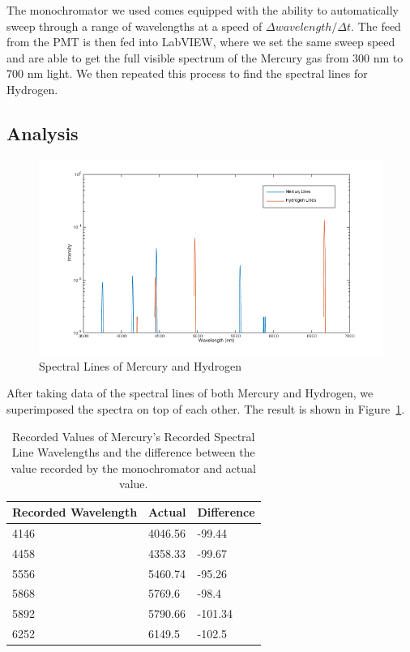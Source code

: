 The monochromator we used comes equipped with the ability to automatically sweep through a range of wavelengths at a speed of $\Delta wavelength / \Delta t$. The feed from the PMT is then fed into LabVIEW, where we set the same sweep speed and are able to get the full visible spectrum of the Mercury gas from 300 nm to 700 nm light. We then repeated this process to find the spectral lines for Hydrogen. 

\subsection{Analysis}

\begin{figure}[t]
  \includegraphics[width=\textwidth, height = 10 cm]{Balmer.png}
  \caption{Spectral Lines of Mercury and Hydrogen}
  \label{Spectrums}
\end{figure}

After taking data of the spectral lines of both Mercury and Hydrogen, we superimposed the spectra on top of each other. The result is shown in Figure~\ref{Spectrums}. 

\begin{table}[h]
\begin{tabular}{|l|l|l|}
\hline
Recorded Wavelength & Actual  & Difference \\ \hline
4146                & 4046.56 & -99.44     \\
4458                & 4358.33 & -99.67     \\
5556                & 5460.74 & -95.26     \\
5868                & 5769.6  & -98.4      \\
5892                & 5790.66 & -101.34    \\
6252                & 6149.5  & -102.5     \\ \hline
\end{tabular}
\caption{Recorded Values of Mercury's Recorded Spectral Line Wavelengths and the difference between the value recorded by the monochromator and actual value.}
\label{Mercury Recorded vs Actual}
\end{table}

